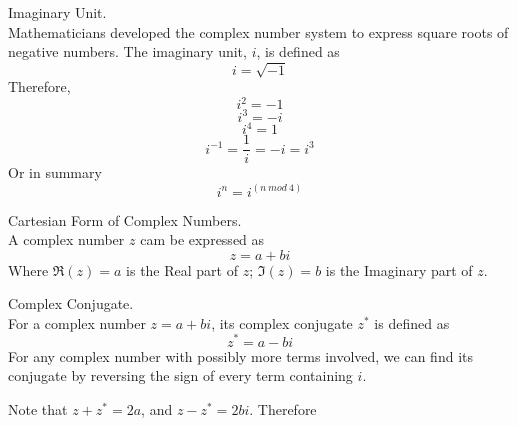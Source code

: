 \documentclass[11pt]{article}
\theoremstyle{gangnamstyle}{\newtheorem{definition}{Definition}[]}
\theoremstyle{gangnamstyle}{\newtheorem{example}{Example}[]}
\theoremstyle{gangnamstyle}{\newtheorem{problem}{Problem}[]}
\begin{document}
\begin{definition}
Imaginary Unit. \\
Mathematicians developed the complex number system to express square roots of negative numbers. The imaginary unit, $i$, is defined as
\begin{equation}
i = \sqrt{-1}
\end{equation}
Therefore, 
\begin{equation}
i^2 = -1
\end{equation}
\begin{equation}
i^3 = -i
\end{equation}
\begin{equation}
i^4 = 1
\end{equation}
\begin{equation}
i^{-1} = \frac{1}{i} = -i = i^3
\end{equation}
Or in summary
\begin{equation}
i^n = i^{(n \ mod \ 4)}
\end{equation}
\end{definition}

\begin{definition}
Cartesian Form of Complex Numbers. \\
A complex number $z$ cam be expressed as 
\begin{equation}
z = a + bi
\end{equation}
Where $\Re(z) = a$ is the Real part of $z$; $\Im(z) = b$ is the Imaginary part of $z$. 
\end{definition}

\begin{definition}
Complex Conjugate. \\
For a complex number $z = a + bi$, its complex conjugate $z^*$ is defined as
\begin{equation}
z^* = a - bi
\end{equation}
For any complex number with possibly more terms involved, we can find its conjugate by reversing the sign of every term containing $i$. 
\end{definition}

Note that $z + z^* = 2a$, and $z - z^* = 2bi$. Therefore
\end{document}
